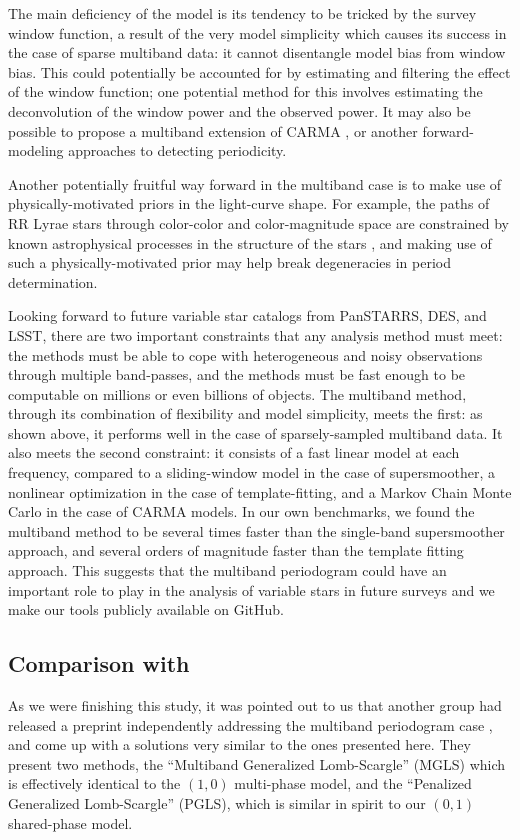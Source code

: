 \documentclass[12pt,preprint]{aastex}
\begin{document}
The main deficiency of the model is its tendency to be tricked by the survey window function, a result of the very model simplicity which causes its success in the case of sparse multiband data: it cannot disentangle model bias from window bias.
This could potentially be accounted for by estimating and filtering the effect of the window function; one potential method for this involves estimating the deconvolution of the window power and the observed power.
It may also be possible to propose a multiband extension of CARMA \citep{Kelly14},
or another forward-modeling approaches to detecting periodicity.

Another potentially fruitful way forward in the multiband case is to make use of physically-motivated priors in the light-curve shape. For example, the paths of RR Lyrae stars through color-color and color-magnitude space are constrained by known astrophysical processes in the structure of the stars \citep[e.g., see Fig. 5 in][]{Szabo2014}, and making use of such a physically-motivated prior may help break degeneracies in period determination.

Looking forward to future variable star catalogs from PanSTARRS, DES, and LSST, there are two important constraints that any analysis method must meet: the methods must be able to cope with heterogeneous and noisy observations through multiple band-passes, and the methods must be fast enough to be computable on millions or even billions of objects.
The multiband method, through its combination of flexibility and model simplicity, meets the first: as shown above, it performs well in the case of sparsely-sampled multiband data.
It also meets the second constraint: it consists of a fast linear model at each frequency, compared to a sliding-window model in the case of supersmoother, a nonlinear optimization in the case of template-fitting, and a Markov Chain Monte Carlo in the case of CARMA models.
In our own benchmarks, we found the multiband method to be several times faster than the single-band supersmoother approach, and several orders of magnitude faster than the template fitting approach.
This suggests that the multiband periodogram could have an important role to play in the analysis of variable stars in future surveys
and we make our tools publicly available on GitHub. 

\subsection{Comparison with \citet{Long2014}}
As we were finishing this study, it was pointed out to us that another group had released a preprint independently addressing the multiband periodogram case \citep[][hereafter LCB14]{Long2014}, and come up with a solutions very similar to the ones presented here.
They present two methods, the ``Multiband Generalized Lomb-Scargle'' (MGLS) which is effectively identical to the $(1, 0)$ multi-phase model, and the ``Penalized Generalized Lomb-Scargle'' (PGLS), which is similar in spirit to our $(0, 1)$ shared-phase model.
\end{document}
